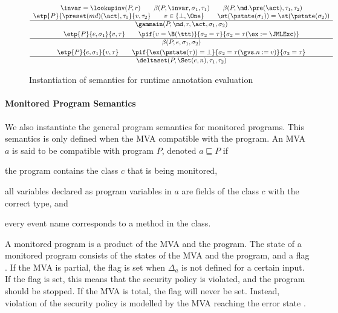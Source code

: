 \begin{figure}[t]
\[
\begin{array}[t]{c}
\invar = \lookupinv(P, r) \qquad
\beta(P, \invar, \sigma_1, \tau_1) \qquad
\beta(P, \md.\pre(\act), \tau_1, \tau_2) \\
\etp{P}{\preset(md)(\act), \tau_1}{v,\tau_2} \qquad v\in\{\bot,\One\} \qquad
\st(\pstate(\sigma_1)) = \st(\pstate(\sigma_2))\\
\hline
\gammain(P, \md, r, \act, \sigma_1, \sigma_2)
\smallskip\\


\etp{P}{e, \sigma_1}{v, \tau} \qquad
\pif{v = \B(\ttt)}{\sigma_2 = \tau}{\sigma_2 = \tau (\ex := \JMLExc)}\\
\hline
\beta(P, e, \sigma_1, \sigma_2)

\smallskip\\

\etp{P}{e, \sigma_1}{v, \tau} \qquad
\pif{\ex(\pstate(\tau)) = \bot}{\sigma_2 = \tau (\gvs.n :=
v)}{\sigma_2 = \tau}\\
\hline
\deltaset(P, \Set(e, n), \tau_1, \tau_2)
\end{array}
\]
\caption{Instantiation of semantics for runtime annotation evaluation}
\label{FigAnnotatedSem}
\end{figure}

\paragraph{Monitored Program Semantics}
We also instantiate the general program semantics for monitored
programs. This semantics is only defined when the MVA compatible with
the program. An MVA \(a\) is said to be compatible with program \(P\),
denoted \(a \sqsubseteq P\) if
\begin{inparaenum}
\item the program contains the class \(c\) that is being monitored,
\item all variables declared as program variables in
\(a\) are fields of the class \(c\) with the correct type, and
\item every event name corresponds to a method in the class.
\end{inparaenum}
A monitored program is a product of the MVA and the program. The state
of a monitored program consists of the states of the MVA and the
program, and a flag \stuck. If the MVA is partial, the flag
\stuck is set when \(\Delta_a\) is not defined for a
certain input. If the flag is set, this means that the security policy
is violated, and the program should be stopped. If the MVA is total,
the \stuck flag will never be set. Instead, violation of the security
policy is modelled by the MVA reaching the error state \halted.


